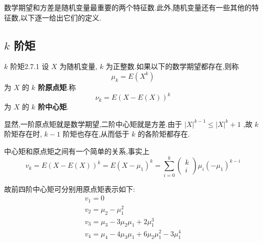数学期望和方差是随机变量最重要的两个特征数.此外,随机变量还有一些其他的特征数,以下逐一给出它们的定义.

\subsection{$ k $ 阶矩}\label{ssec:2.7.1}

\begin{definition}{$ k $ 阶矩}{2.7.1}
	设 $ X $ 为随机变量, $ k $ 为正整数.如果以下的数学期望都存在,则称
	\begin{equation}
	\mu_{k}=E\left(X^{k}\right) \label{eq:2.7.1}
	\end{equation}
	为 $ X $ 的 \textbf{ $ k $ 阶原点矩}.称
	\begin{equation}
	\nu_{k}=E(X-E(X))^{k} \label{eq:2.7.2}
	\end{equation}
	为 $ X $ 的 \textbf{ $ k $ 阶中心矩}.
\end{definition}


显然,一阶原点矩就是数学期望,二阶中心矩就是方差.由于 $ |X|^{k-1} \leqslant |X|^{k}+1 $ ,故 $ k $ 阶矩存在时, $ k-1 $ 阶矩也存在,从而低于 $ k $ 的各阶矩都存在.

中心矩和原点矩之间有一个简单的关系,事实上
\[
v_{k}=E(X-E(X))^{k}=E\left(X-\mu_{1}\right)^{k}=\sum_{i=0}^{k} \left( \begin{array}{l}{k} \\ {i}\end{array}\right) \mu_{i}\left(-\mu_{1}\right)^{k-i}
\]

故前四阶中心矩可分别用原点矩表示如下:
\[
\begin{array}{l}{v_{1}=0} \\ {v_{2}=\mu_{2}-\mu_{1}^{2}} \\ {v_{3}=\mu_{3}-3 \mu_{2} \mu_{1}+2 \mu_{1}^{3}} \\ {v_{4}=\mu_{4}-4 \mu_{3} \mu_{1}+6 \mu_{2} \mu_{1}^{2}-3 \mu_{1}^{4}}\end{array}
\]

